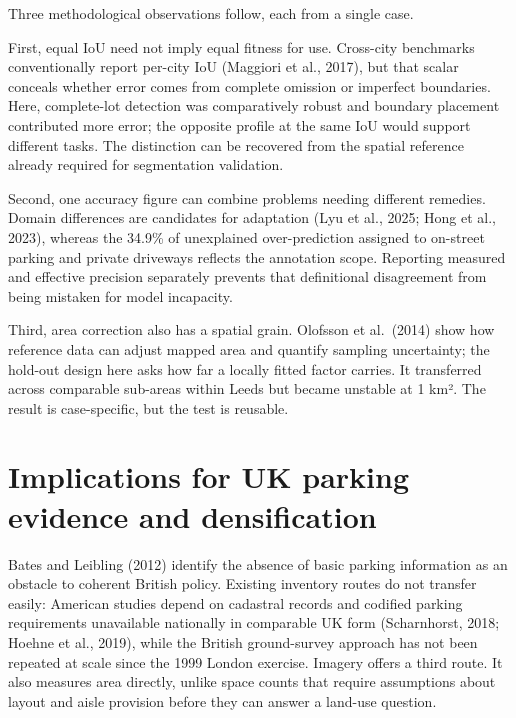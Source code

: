 Three methodological observations follow, each from a single case.

First, equal IoU need not imply equal fitness for use. Cross-city benchmarks conventionally report per-city IoU (Maggiori et al., 2017), but that scalar conceals whether error comes from complete omission or imperfect boundaries. Here, complete-lot detection was comparatively robust and boundary placement contributed more error; the opposite profile at the same IoU would support different tasks. The distinction can be recovered from the spatial reference already required for segmentation validation.

Second, one accuracy figure can combine problems needing different remedies. Domain differences are candidates for adaptation (Lyu et al., 2025; Hong et al., 2023), whereas the 34.9\% of unexplained over-prediction assigned to on-street parking and private driveways reflects the annotation scope. Reporting measured and effective precision separately prevents that definitional disagreement from being mistaken for model incapacity.

Third, area correction also has a spatial grain. Olofsson et al.~(2014) show how reference data can adjust mapped area and quantify sampling uncertainty; the hold-out design here asks how far a locally fitted factor carries. It transferred across comparable sub-areas within Leeds but became unstable at 1 km². The result is case-specific, but the test is reusable.

\hypertarget{implications-for-uk-parking-evidence-and-densification}{%
\section{Implications for UK parking evidence and densification}\label{implications-for-uk-parking-evidence-and-densification}}

Bates and Leibling (2012) identify the absence of basic parking information as an obstacle to coherent British policy. Existing inventory routes do not transfer easily: American studies depend on cadastral records and codified parking requirements unavailable nationally in comparable UK form (Scharnhorst, 2018; Hoehne et al., 2019), while the British ground-survey approach has not been repeated at scale since the 1999 London exercise. Imagery offers a third route. It also measures area directly, unlike space counts that require assumptions about layout and aisle provision before they can answer a land-use question.

